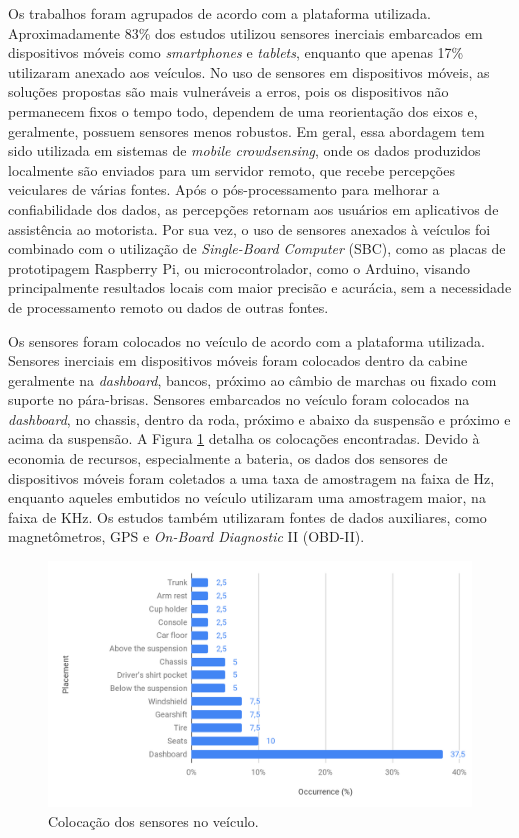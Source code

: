 Os trabalhos foram agrupados de acordo com a plataforma utilizada. Aproximadamente 83\% dos estudos utilizou sensores inerciais embarcados em dispositivos móveis como \textit{smartphones} e \textit{tablets}, enquanto que apenas 17\% utilizaram anexado aos veículos. No uso de sensores em dispositivos móveis, as soluções propostas são mais vulneráveis a erros, pois os dispositivos não permanecem fixos o tempo todo, dependem de uma reorientação dos eixos e, geralmente, possuem sensores menos robustos. Em geral, essa abordagem tem sido utilizada em sistemas de \textit{mobile crowdsensing}, onde os dados produzidos localmente são enviados para um servidor remoto, que recebe percepções veiculares de várias fontes. Após o pós-processamento para melhorar a confiabilidade dos dados, as percepções retornam aos usuários em aplicativos de assistência ao motorista. Por sua vez, o uso de sensores anexados à veículos foi combinado com o utilização de \textit{Single-Board Computer} (SBC), como as placas de prototipagem Raspberry Pi, ou microcontrolador, como o Arduino, visando principalmente resultados locais com maior precisão e acurácia, sem a necessidade de processamento remoto ou dados de outras fontes.

Os sensores foram colocados no veículo de acordo com a plataforma utilizada. Sensores inerciais em dispositivos móveis foram colocados dentro da cabine geralmente na \textit{dashboard}, bancos, próximo ao câmbio de marchas ou fixado com suporte no pára-brisas. Sensores embarcados no veículo foram colocados na \textit{dashboard}, no chassis, dentro da roda, próximo e abaixo da suspensão e próximo e acima da suspensão. A Figura \ref{fig:sensor_placement_ocurrence} detalha os colocações encontradas. Devido à economia de recursos, especialmente a bateria, os dados dos sensores de dispositivos móveis foram coletados a uma taxa de amostragem na faixa de Hz, enquanto aqueles embutidos no veículo utilizaram uma amostragem maior, na faixa de KHz. Os estudos também utilizaram fontes de dados auxiliares, como magnetômetros, GPS e \textit{On-Board Diagnostic} II (OBD-II).

\begin{figure}[h!]
  \centering
  \caption{Colocação dos sensores no veículo.}
   \label{fig:sensor_placement_ocurrence}
   \includegraphics[width=1\textwidth]{figuras/fig3_1.png}
\end{figure}

